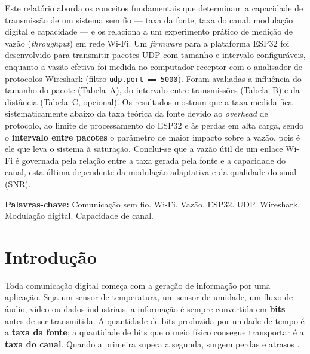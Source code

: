 \documentclass[
  12pt,
  a4paper,
  oneside,
  brazil,
  chapter=TITLE,
  section=TITLE,
]{abntex2}
\begin{document}
\begin{resumo}
Este relatório aborda os conceitos fundamentais que determinam a capacidade de
transmissão de um sistema sem fio --- taxa da fonte, taxa do canal, modulação
digital e capacidade --- e os relaciona a um experimento prático de medição de
vazão (\textit{throughput}) em rede Wi-Fi. Um \textit{firmware} para a
plataforma ESP32 foi desenvolvido para transmitir pacotes UDP com tamanho e
intervalo configuráveis, enquanto a vazão efetiva foi medida no computador
receptor com o analisador de protocolos Wireshark (filtro
\texttt{udp.port == 5000}). Foram avaliadas a influência do tamanho do pacote
(Tabela~A), do intervalo entre transmissões (Tabela~B) e da distância
(Tabela~C, opcional). Os resultados mostram que a taxa medida fica
sistematicamente abaixo da taxa teórica da fonte devido ao \textit{overhead} de
protocolo, ao limite de processamento do ESP32 e às perdas em alta carga, sendo
o \textbf{intervalo entre pacotes} o parâmetro de maior impacto sobre a vazão,
pois é ele que leva o sistema à saturação. Conclui-se que a vazão útil de um
enlace Wi-Fi é governada pela relação entre a taxa gerada pela fonte e a
capacidade do canal, esta última dependente da modulação adaptativa e da
qualidade do sinal (SNR).

\vspace{\onelineskip}
\noindent\textbf{Palavras-chave:} Comunicação sem fio. Wi-Fi. Vazão. ESP32.
UDP. Wireshark. Modulação digital. Capacidade de canal.
\end{resumo}

\tableofcontents*
\cleardoublepage

\textual

\chapter{Introdução}

Toda comunicação digital começa com a geração de informação por uma aplicação.
Seja um sensor de temperatura, um sensor de umidade, um fluxo de áudio, vídeo ou
dados industriais, a informação é sempre convertida em \textbf{bits} antes de
ser transmitida. A quantidade de bits produzida por unidade de tempo é a
\textbf{taxa da fonte}; a quantidade de bits que o meio físico consegue
transportar é a \textbf{taxa do canal}. Quando a primeira supera a segunda,
surgem perdas e atrasos \cite{tanenbaum2011}.
\end{document}
